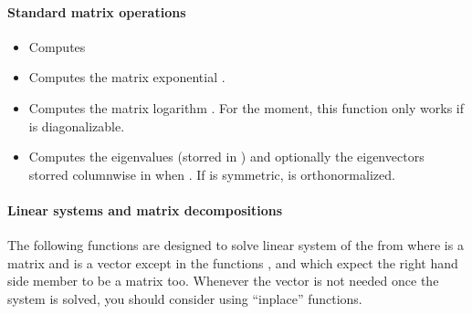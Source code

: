 \paragraph{Standard matrix operations}
\begin{itemize}

\item {}
  \sshortdescribe Computes 

  
\item {}
  \sshortdescribe Computes the matrix exponential .

\item {}
  \sshortdescribe Computes the matrix logarithm . For the
  moment, this function only works if  is diagonalizable.

\item {}
  \sshortdescribe Computes the eigenvalues (storred in ) and optionally
  the eigenvectors storred columnwise in  when
  . If  is symmetric,  is orthonormalized.
\end{itemize}

\paragraph{Linear systems and matrix decompositions}

The following functions are designed to solve linear system of the from  where  is a matrix and  is a vector except in the functions
,  and
 which expect the right hand side member to be a
matrix too. Whenever the vector  is not needed once the system is solved,
you should consider using ``inplace'' functions.

